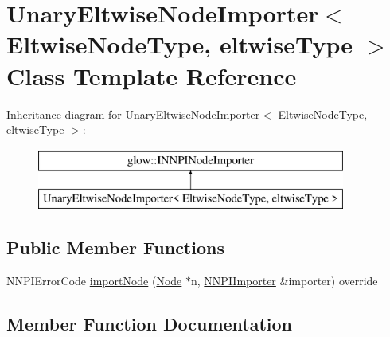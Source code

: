 \hypertarget{class_unary_eltwise_node_importer}{}\section{Unary\+Eltwise\+Node\+Importer$<$ Eltwise\+Node\+Type, eltwise\+Type $>$ Class Template Reference}
\label{class_unary_eltwise_node_importer}
Inheritance diagram for Unary\+Eltwise\+Node\+Importer$<$ Eltwise\+Node\+Type, eltwise\+Type $>$\+:\begin{figure}[H]
\begin{center}
\leavevmode
\includegraphics[height=2.000000cm]{class_unary_eltwise_node_importer}
\end{center}
\end{figure}
\subsection*{Public Member Functions}
\begin{DoxyCompactItemize}
\item 
N\+N\+P\+I\+Error\+Code \hyperlink{class_unary_eltwise_node_importer_a5ded2065460eb66367c2fd2705d4556d}{import\+Node} (\hyperlink{classglow_1_1_node}{Node} $\ast$n, \hyperlink{classglow_1_1_n_n_p_i_importer}{N\+N\+P\+I\+Importer} \&importer) override
\end{DoxyCompactItemize}


\subsection{Member Function Documentation}
\mbox{\label{class_unary_eltwise_node_importer_a5ded2065460eb66367c2fd2705d4556d}} 
